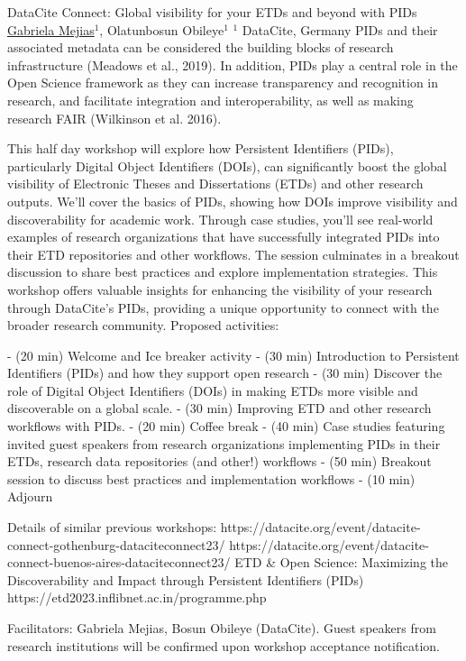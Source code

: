 
    \begin{abstract_online}{DataCite Connect: Global visibility for your ETDs and beyond with PIDs}{%
        \underline{Gabriela Mejias}$^{1}$, Olatunbosun Obileye$^{1}$}{%
        }{%
        $^1$ DataCite, Germany}
        PIDs and their associated metadata can be considered the building blocks of research infrastructure (Meadows et al., 2019).  In addition,  PIDs play a central role in the Open Science framework as they can increase transparency and recognition in research, and facilitate integration and interoperability, as well as making research FAIR (Wilkinson et al. 2016).

        This half day  workshop will explore how Persistent Identifiers (PIDs), particularly Digital Object Identifiers (DOIs), can significantly boost the global visibility of Electronic Theses and Dissertations (ETDs) and other research outputs. We'll cover the basics of PIDs, showing how DOIs improve visibility and discoverability for academic work. Through case studies, you'll see real-world examples of research organizations that have successfully integrated PIDs into their ETD repositories and other workflows. The session culminates in a breakout discussion to share best practices and explore implementation strategies. This workshop offers valuable insights for enhancing the visibility of your research through DataCite's PIDs, providing a unique opportunity to connect with the broader research community.
        Proposed activities:

        - (20 min) Welcome and Ice breaker activity
        - (30 min) Introduction to Persistent Identifiers (PIDs) and how they support open research
        - (30 min) Discover the role of Digital Object Identifiers (DOIs) in making ETDs more visible and discoverable on a global scale.
        - (30 min) Improving ETD and other research workflows with PIDs.
        - (20 min) Coffee break
        - (40 min) Case studies featuring invited guest speakers from research organizations implementing PIDs in their ETDs, research data repositories (and other!) workflows
        - (50 min) Breakout session to discuss best practices and implementation workflows
        - (10 min) Adjourn

        Details of similar previous workshops: https://datacite.org/event/datacite-connect-gothenburg-dataciteconnect23/
        https://datacite.org/event/datacite-connect-buenos-aires-dataciteconnect23/
        ETD & Open Science: Maximizing the Discoverability and Impact
        through Persistent Identifiers (PIDs) https://etd2023.inflibnet.ac.in/programme.php

        Facilitators: Gabriela Mejias, Bosun Obileye (DataCite). Guest speakers from research institutions will be confirmed upon workshop acceptance notification.
    
    \end{abstract_online}
    
